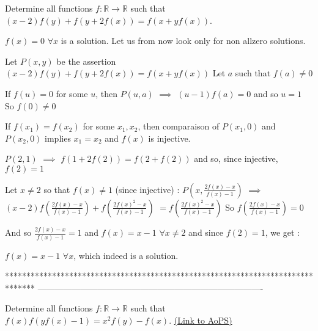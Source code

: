 \begin{solution}
	\begin{tcolorbox}Determine all functions $f: \mathbb{R}\to\mathbb{R}$ such that $(x-2)f(y)+f(y+2f(x))=f(x+yf(x))$.\end{tcolorbox}
$\boxed{f(x)=0}$ $\forall x$ is a solution.
Let us from now look only for non allzero solutions.

Let $P(x,y)$ be the assertion $(x-2)f(y)+f(y+2f(x))=f(x+yf(x))$
Let $a$ such that $f(a)\ne 0$

If $f(u)=0$ for some $u$, then $P(u,a)$ $\implies$ $(u-1)f(a)=0$ and so $u=1$
So $f(0)\ne 0$

If $f(x_1)=f(x_2)$ for some $x_1,x_2$, then comparaison of $P(x_1,0)$ and $P(x_2,0)$ implies $x_1=x_2$ and $f(x)$ is injective.

$P(2,1)$ $\implies$ $f(1+2f(2))=f(2+f(2))$ and so, since injective, $f(2)=1$

Let $x\ne 2$ so that $f(x)\ne 1$ (since injective) :
$P(x,\frac{2f(x)-x}{f(x)-1})$ $\implies$ $(x-2)f(\frac{2f(x)-x}{f(x)-1})+f(\frac{2f(x)^2-x}{f(x)-1})$ $=f(\frac{2f(x)^2-x}{f(x)-1})$
So $f(\frac{2f(x)-x}{f(x)-1})=0$

And so $\frac{2f(x)-x}{f(x)-1}=1$ and $f(x)=x-1$ $\forall x\ne 2$ and since $f(2)=1$, we get :

$\boxed{f(x)=x-1}$ $\forall x$, which indeed is a solution.
\end{solution}
*******************************************************************************
-------------------------------------------------------------------------------

\begin{problem}
	Determine all functions $f: \mathbb{R}\to\mathbb{R}$ such that $f(x)f(yf(x)-1)=x^2f(y)-f(x)$.
	\flushright \href{https://artofproblemsolving.com/community/c6h557982}{(Link to AoPS)}
\end{problem}



